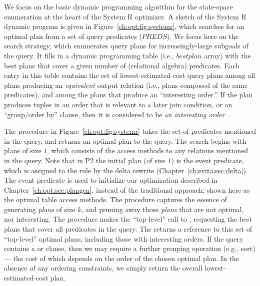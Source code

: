 We focus on the basic dynamic programming algorithm for the state-space
enumeration at the heart of the System R optimizer.  A sketch of the System R
dynamic program is given in Figure~\ref{ch:opt:fig:systemr}, which searches for
an optimal plan from a set of query predicates ($PREDS$).  We focus here on the
search strategy, which enumerates query plans for increasingly-large subgoals
of the query.  It fills in a dynamic programming table (i.e., $bestplan$ array)
with the best plans that cover a given number of (relational algebra)
predicates.  Each entry in this table contains the set of lowest-estimated-cost
query plans among all plans producing an {\em equivalent} output relation
(i.e., plans composed of the same predicates), and among the plans that produce
an ``interesting order.'' If the plan produces tuples in an order that is
relevant to a later join condition, or an ``group/order by'' clause, then it is
considered to be an {\em interesting order}~\cite{selinger}.

The  procedure in Figure~\ref{ch:opt:fig:systemr} takes the set of
predicates mentioned in the query, and returns an optimal plan to the query.
The search begins with plans of size $1$, which consists of the access methods
to any relations mentioned in the query.  Note that in P2 the initial plan (of
size $1$) is the event predicate, which is assigned to the rule by the delta
rewrite (Chapter~\ref{ch:evita:sec:delta}).  The event predicate is used to
initialize our optimization described in Chapter~\ref{ch:opt:sec:plangen},
instead of the traditional approach; shown here as the optimal table access
methods.  The  procedure captures the essence of generating {\em
plans} of size $k$, and pruning away those {\em plans} that are not optimal,
nor interesting.  The  procedure makes the ``top-level'' call to
, requesting the best plans that cover all predicates in the query.
The  returns a reference to this set of ``top-level'' optimal plans,
including those with interesting orders.  If the query contains a 
or  clause, then we may require a further grouping operation
(e.g., sort) --- the cost of which depends on the order of the chosen optimal
plan.  In the absence of any ordering constraints, we simply return the overall
lowest-estimated-cost plan.

